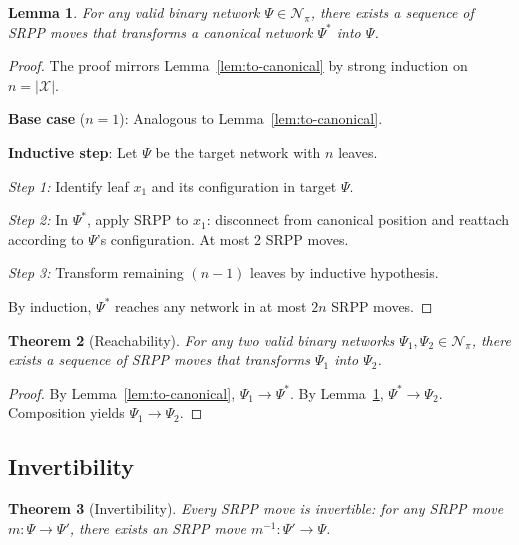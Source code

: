 \documentclass{article}
\newtheorem{theorem}{Theorem}
\newtheorem{lemma}[theorem]{Lemma}
\begin{document}
\begin{lemma}\label{lem:from-canonical}
For any valid binary network $\Psi \in \mathcal{N}_\pi$, there exists a sequence of SRPP moves that transforms a canonical network $\Psi^*$ into $\Psi$.
\end{lemma}

\begin{proof}
The proof mirrors Lemma~\ref{lem:to-canonical} by strong induction on $n = |\mathcal{X}|$.

\textbf{Base case} ($n = 1$): Analogous to Lemma~\ref{lem:to-canonical}.

\textbf{Inductive step}: Let $\Psi$ be the target network with $n$ leaves.

\textit{Step 1:} Identify leaf $x_1$ and its configuration in target $\Psi$.

\textit{Step 2:} In $\Psi^*$, apply SRPP to $x_1$: disconnect from canonical position and reattach according to $\Psi$'s configuration. At most 2 SRPP moves.

\textit{Step 3:} Transform remaining $(n-1)$ leaves by inductive hypothesis.

By induction, $\Psi^*$ reaches any network in at most $2n$ SRPP moves.
\end{proof}

\begin{theorem}[Reachability]\label{thm:reachability}
For any two valid binary networks $\Psi_1, \Psi_2 \in \mathcal{N}_\pi$, there exists a sequence of SRPP moves that transforms $\Psi_1$ into $\Psi_2$. 
\end{theorem}

\begin{proof}
By Lemma~\ref{lem:to-canonical}, $\Psi_1 \to \Psi^*$. By Lemma~\ref{lem:from-canonical}, $\Psi^* \to \Psi_2$. Composition yields $\Psi_1 \to \Psi_2$.
\end{proof}

\subsection{Invertibility}

\begin{theorem}[Invertibility]\label{thm:invertibility}
Every SRPP move is invertible: for any SRPP move $m: \Psi \to \Psi'$, there exists an SRPP move $m^{-1}: \Psi' \to \Psi$.
\end{theorem}
\end{document}
